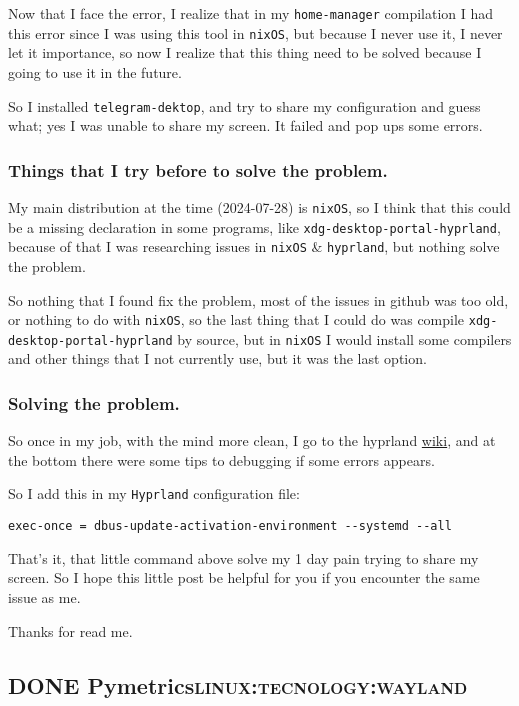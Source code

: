 \documentclass[11pt]{article}
\begin{document}
Now that I face the error, I realize that in my \texttt{home-manager} compilation I had this error since I was using this tool in \texttt{nixOS}, but because I never use it, I never let it importance, so now I realize that this thing need to be solved because I going to use it in the future.

So I installed \texttt{telegram-dektop}, and try to share my configuration and guess what; yes I was unable to share my screen. It failed and pop ups some errors.
\subsubsection{Things that I try before to solve the problem.}
\label{sec:orge2eb8b4}
My main distribution at the time (2024-07-28) is \texttt{nixOS}, so I think that this could be a missing declaration in some programs, like \texttt{xdg-desktop-portal-hyprland}, because of that I was researching issues in \texttt{nixOS} \& \texttt{hyprland}, but nothing solve the problem.

So nothing that I found fix the problem, most of the issues in github was too old, or nothing to do with \texttt{nixOS}, so the last thing that I could do was compile \texttt{xdg-desktop-portal-hyprland} by source, but in \texttt{nixOS} I would install some compilers and other things that I not currently use, but it was the last option.
\subsubsection{Solving the problem.}
\label{sec:org2ae08cb}
So once in my job, with the mind more clean, I go to the hyprland \href{https://wiki.hyprland.org/Useful-Utilities/xdg-desktop-portal-hyprland/}{wiki}, and at the bottom there were some tips to debugging if some errors appears.

So I add this in my \texttt{Hyprland} configuration file:

\begin{verbatim}
exec-once = dbus-update-activation-environment --systemd --all
\end{verbatim}

That's it, that little command above solve my 1 day pain trying to share my screen. So I hope this little post be helpful for you if you encounter the same issue as me.

Thanks for read me.
\subsection{{\bfseries\sffamily DONE} Pymetrics\hfill{}\textsc{linux:tecnology:wayland}}
\label{sec:org724736a}
\end{document}
